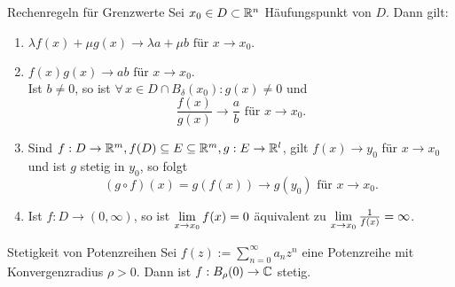\documentclass[main.tex]{subfiles}
\begin{document}
\begin{karte}{Rechenregeln für Grenzwerte}
    Sei \( x_0 \in D \subset \mathbb{R}^n \) Häufungspunkt von \( D \). 
    Dann gilt:
    \begin{enumerate}
        \item 
        \( \lambda f(x) + \mu g(x) \rightarrow \lambda a + \mu b
        \text{ für } x \rightarrow x_0. \)
        \item 
        \( f(x) g(x) \rightarrow a b \text{ für } 
        x\rightarrow x_0. \) \\
        Ist \( b\neq 0 \), so ist \( \forall \, x\in 
        D \cap B_\delta(x_0) : g(x) \neq 0 \) und 
        \[ \frac{f(x)}{g(x)} \rightarrow \frac{a}{b} \text{ für } 
        x\rightarrow x_0. \]
        \item Sind \( f: D \rightarrow \mathbb{R}^m, f(D) \subseteq E 
        \subseteq \mathbb{R}^m, g : E \rightarrow \mathbb{R}^l \), gilt 
        \( f(x) \rightarrow y_0 \) für \( x\rightarrow x_0 \) und
        ist \(g\) stetig in \( y_0 \), so folgt
        \[ (g\circ f)(x) = g(f(x)) \rightarrow g(y_0) \text{ für }
        x \rightarrow x_0. \]
        \item Ist \( f : D \rightarrow (0, \infty) \), so ist 
        \( \lim\limits_{x\rightarrow x_0} f(x) = 0 \) äquivalent zu 
        \( \lim\limits_{x\rightarrow x_0} \frac{1}{f(x)} = \infty \).
    \end{enumerate}
\end{karte}
\begin{karte}{Stetigkeit von Potenzreihen}
    Sei \( f(z) := \sum_{n=0}^\infty a_n z^n \) eine 
    Potenzreihe mit Konvergenzradius \( \rho > 0 \). 
    Dann ist \( f: B_\rho(0) \rightarrow \mathbb{C} \) stetig.
\end{karte}
\end{document}
